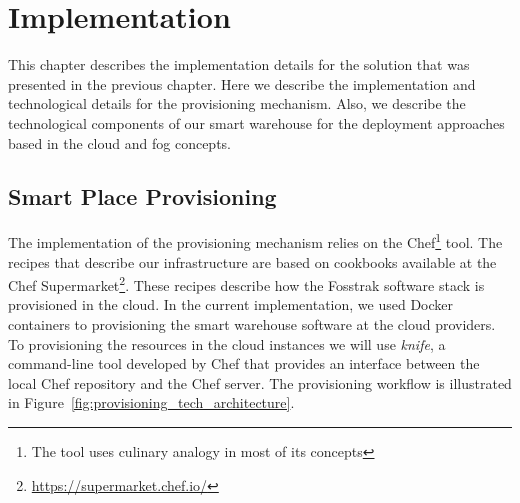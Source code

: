
\chapter{Implementation}
\label{chapter:implementation}
This chapter describes the implementation details for the solution that was presented in the previous
chapter. Here we describe the implementation and technological details for the provisioning mechanism.
Also, we describe the technological components of our smart warehouse for the deployment approaches
based in the cloud and fog concepts.

\section{Smart Place Provisioning}
\label{sec:impl_provisioning}
The implementation of the provisioning mechanism relies on the Chef\footnote{The tool uses culinary analogy in most of its concepts}
tool. The recipes that describe our infrastructure are based on cookbooks available at the Chef
Supermarket\footnote{\url{https://supermarket.chef.io/}}. These recipes describe how the Fosstrak software
stack is provisioned in the cloud. In the current implementation, we used Docker containers to provisioning
the smart warehouse software at the cloud providers. To provisioning the resources in the cloud instances
we will use \textit{knife}, a command-line tool developed by Chef that provides an interface between
the local Chef repository and the Chef server. The provisioning workflow is illustrated in
Figure~\ref{fig:provisioning_tech_architecture}.\\

